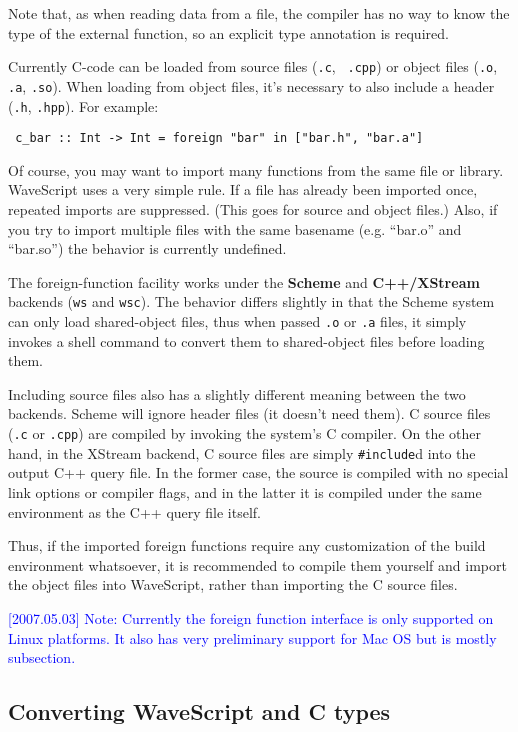 \documentclass[twocolumn]{report}
\newcommand{\rednote}[1]{{\textcolor{blue}{#1}}}
\newenvironment{wscode}{\begin{center}\tt}{\end{center}}
\begin{document}
Note that, as when reading data from a file, the compiler has no way
to know the type of the external function, so an explicit type
annotation is required.

Currently C-code can be loaded from source files ({\tt .c}, {\tt
  .cpp}) or object files ({\tt .o}, {\tt .a}, {\tt .so}).  When
  loading from object files, it's necessary to also include a header
  ({\tt .h}, {\tt .hpp}).  For example:

\begin{wscode}
c\_bar :: Int -> Int = foreign "bar" in ["bar.h", "bar.a"]
\end{wscode}

Of course, you may want to import many functions from the same file or
library.  WaveScript uses a very simple rule.  If a file has already
been imported once, repeated imports are suppressed.  (This goes for
source and object files.)  Also, if you try to import multiple files with
the same basename (e.g. ``bar.o'' and ``bar.so'') the behavior is
currently undefined.

The foreign-function facility works under the {\bf Scheme} and {\bf
 C++/XStream} backends ({\tt ws} and {\tt wsc}).  The behavior differs
 slightly in that the Scheme system can only load shared-object files,
 thus when passed {\tt .o} or {\tt .a} files, it simply invokes a
 shell command to convert them to shared-object files before loading
 them.

Including source files also has a slightly different meaning between
the two backends.  Scheme will ignore header files (it doesn't need
them).  C source files ({\tt .c} or {\tt .cpp}) are compiled by
invoking the system's C compiler.  On the other hand, in the XStream backend, C source
files are simply {\tt \#include}d into the output C++ query file.  In
the former case, the source is compiled with no special link options
or compiler flags, and in the latter it is compiled under the same
environment as the C++ query file itself.

Thus, if the imported foreign functions require any customization of
the build environment whatsoever, it is recommended to compile them
yourself and import the object files into WaveScript, rather than
importing the C source files.

\rednote{[2007.05.03] Note: Currently the foreign function interface is only
supported on Linux platforms.  It also has very preliminary support
for Mac OS but is mostly subsection.}

\subsection{Converting WaveScript and C types}
\end{document}
